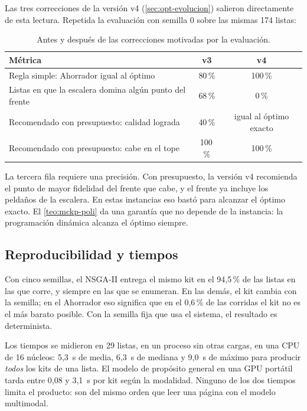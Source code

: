 Las tres correcciones de la versión v4 (\cref{sec:opt-evolucion}) salieron
directamente de esta lectura. Repetida la evaluación con semilla 0 sobre las
mismas 174 listas:

\begin{table}[htbp]
\centering\small
\caption{Antes y después de las correcciones motivadas por la evaluación.}
\label{tab:antes-despues}
\begin{tabular}{@{}L{7.2cm}cc@{}}
\toprule
Métrica & v3 & v4 \\
\midrule
Regla simple: Ahorrador igual al óptimo & 80\,\% & 100\,\% \\
Listas en que la escalera domina algún punto del frente & 68\,\% & 0\,\% \\
Recomendado con presupuesto: calidad lograda & 40\,\% & igual al óptimo exacto \\
Recomendado con presupuesto: cabe en el tope & 100\,\% & 100\,\% \\
\bottomrule
\end{tabular}
\end{table}

La tercera fila requiere una precisión. Con presupuesto, la versión v4
recomienda el punto de mayor fidelidad del frente que cabe, y el frente ya
incluye los peldaños de la escalera. En estas instancias eso bastó para
alcanzar el óptimo exacto. El \cref{teo:mckp-poli} da una garantía que no
depende de la instancia: la programación dinámica alcanza el óptimo siempre.

\subsection{Reproducibilidad y tiempos}

Con cinco semillas, el NSGA-II entrega el mismo kit en el 94,5\,\% de las
listas en las que corre, y siempre en las que se enumeran. En las demás, el kit
cambia con la semilla; en el Ahorrador eso significa que en el 0,6\,\% de las
corridas el kit no es el más barato posible. Con la semilla fija que usa el
sistema, el resultado es determinista.

Los tiempos se midieron en 29 listas, en un proceso sin otras cargas, en una
CPU de 16 núcleos: 5,3~s de media, 6,3~s de mediana y 9,0~s de máximo para
producir \emph{todos} los kits de una lista. El modelo de propósito general en
una GPU portátil tarda entre 0,08 y 3,1~s por kit según la modalidad. Ninguno
de los dos tiempos limita el producto: son del mismo orden que leer una página
con el modelo multimodal.

